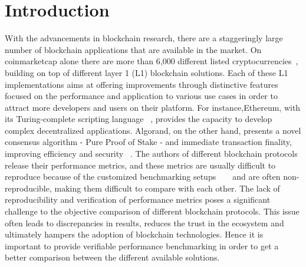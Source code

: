 \chapter{Introduction}
\label{chap:chapterone}


With the advancements in blockchain research, there are a staggeringly large number of blockchain applications that are available in the market. On coinmarketcap alone there are more than 6,000 different listed cryptocurrencies~\cite{coinmarketcap}, building on top of different layer 1 (L1) blockchain solutions. Each of these L1 implementations aims at offering improvements through distinctive features focused on the performance and application to various use cases in order to attract more developers and users on their platform. For instance,Ethereum, with its Turing-complete scripting language ~\cite{Buterin}, provides the capacity to develop complex decentralized applications. Algorand, on the other hand, presents a novel consensus algorithm - Pure Proof of Stake - and immediate transaction finality, improving efficiency and security ~\cite{Dimitri_2022}. The authors of different blockchain protocols release their performance metrics, and these metrics are usually difficult to reproduce because of the customized benchmarking setups ~\cite{PolygonWiki} ~\cite{AlgorandPerformance} and are often non-reproducible, making them difficult to compare with each other. The lack of reproducibility and verification of performance metrics poses a significant challenge to the objective comparison of different blockchain protocols. This issue often leads to discrepancies in results, reduces the trust in the ecosystem and ultimately hampers the adoption of blockchain technologies. Hence it is important to provide verifiable performance benchmarking in order to get a better comparison between the different available solutions.


